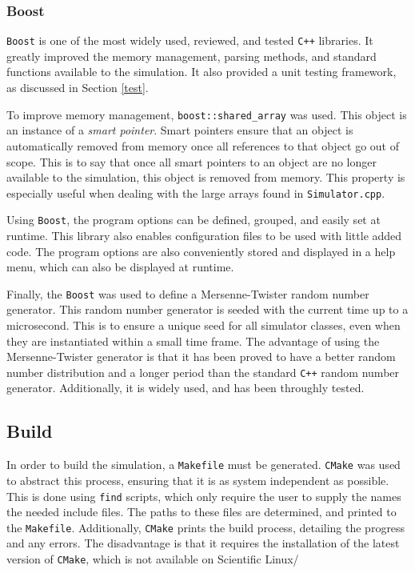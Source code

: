 \documentclass[a4paper,11pt]{article}
\begin{document}

\subsubsection{Boost}

\texttt{Boost} is one of the most widely used, reviewed, and tested \texttt{C++} libraries.  It greatly improved the memory management, parsing methods, and standard functions  available to the simulation.   It also provided a unit testing framework, as discussed in Section \ref{test}.  

To improve memory management, \texttt{boost::shared\_array} was used.  This object is an instance of a \emph{smart pointer}.  Smart pointers ensure that an object is automatically removed from memory once all references to that object go out of scope.  This is to say that once all smart pointers to an object are no longer available to the simulation, this object is removed from memory.  This property is especially useful when dealing with the large arrays found in \texttt{Simulator.cpp}.  

Using \texttt{Boost}, the program options can be defined, grouped, and easily set at runtime.  This library also enables configuration files to be used with little added code.  The program options are also conveniently stored and displayed in a help menu, which can also be displayed at runtime.  

Finally, the \texttt{Boost} was used to define a Mersenne-Twister random number generator.  This random number generator is seeded with the current time up to a microsecond.  This is to ensure a unique seed for all simulator classes, even when they are instantiated within a small time frame.  The advantage of using the Mersenne-Twister generator is that it has been proved to have a better random number distribution and a longer period than the standard \texttt{C++} random number generator.  Additionally, it is widely used, and has been throughly tested.

\subsection{Build}

In order to build the simulation, a \texttt{Makefile} must be generated.  \texttt{CMake} was used to abstract this process, ensuring that it is as system independent as possible.   This is done using \texttt{find} scripts, which only require the user to supply the names the needed include files.  The paths to these files are determined, and printed to the \texttt{Makefile}.  Additionally, \texttt{CMake} prints the build process, detailing the progress and any errors.  The disadvantage is that it requires the installation of the latest version of \texttt{CMake}, which is not available on Scientific Linux/  
\end{document}
